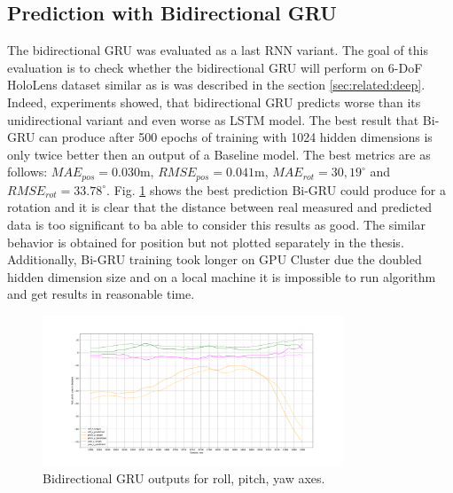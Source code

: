 
\subsection{Prediction with Bidirectional GRU}
\label{sec:eval:experiments:bi-gru}
The bidirectional GRU was evaluated as a last RNN variant. The goal of this evaluation is to check whether the bidirectional GRU will perform on 6-DoF HoloLens dataset similar as is was described in the section \ref{sec:related:deep}. Indeed, experiments showed, that bidirectional GRU predicts worse than its unidirectional variant and even worse as LSTM model. The best result that Bi-GRU can produce after 500 epochs of training with 1024 hidden dimensions is only twice better then an output of a Baseline model. The best metrics are as follows:  $MAE_{pos} = 0.030$m, $RMSE_{pos} = 0.041$m, $MAE_{rot} = 30,19^{\circ}$ and $RMSE_{rot}  =33.78^{\circ}$. Fig. \ref{fig:grubi} shows the best prediction Bi-GRU could produce for a rotation and it is clear that the distance between real measured and predicted data is too significant to ba able to consider this results as good. The similar behavior is obtained for position but not plotted separately in the thesis. Additionally, Bi-GRU training took longer on GPU Cluster due the doubled hidden dimension size and on a local machine it is impossible to run algorithm and get results in reasonable time. 
\begin{figure}[h!]
	\begin{center}
		\includegraphics[width=0.8\textwidth, keepaspectratio]{gfx/gru-bi1-roll_pitch_yaw.pdf}
		\caption{Bidirectional GRU outputs for roll, pitch, yaw axes.}
		\label{fig:grubi}
	\end{center}
\end{figure}